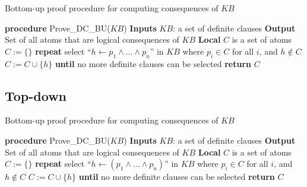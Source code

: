 \documentclass[12pt,a4paper, brazil]{article}
\begin{document}
\begin{algorithm}[!ht]
  \caption{Bottom-up proof procedure for computing consequences of \( KB \)}
  \begin{algorithmic}[1]
  \STATE \textbf{procedure} Prove\_DC\_BU(\( KB \))
  \STATE \textbf{Inputs}
  \STATE \quad \( KB \): a set of definite clauses
  \STATE \textbf{Output}
  \STATE \quad Set of all atoms that are logical consequences of \( KB \)
  \STATE \textbf{Local}
  \STATE \quad \( C \) is a set of atoms
  \STATE \quad \( C := \{\} \)
  \STATE \textbf{repeat}
  \STATE \quad select “\( h \leftarrow p_1 \land \ldots \land p_n \)” in \( KB \) where \( p_i \in C \) for all \( i \), and \( h \notin C \)
  \STATE \quad \( C := C \cup \{h\} \)
  \STATE \textbf{until} no more definite clauses can be selected
  \STATE \textbf{return} \( C \)
  \end{algorithmic}
  \end{algorithm}

\subsection{Top-down}

\begin{algorithm}[!ht]

\caption{Bottom-up proof procedure for computing consequences of \( KB \)}
\label{alg:prove-dc-bu}
\begin{algorithmic}[1]
\STATE \textbf{procedure} Prove\_DC\_BU(\( KB \))
\STATE \textbf{Inputs}
\STATE \quad \( KB \): a set of definite clauses
\STATE \textbf{Output}
\STATE \quad Set of all atoms that are logical consequences of \( KB \)
\STATE \textbf{Local}
\STATE \quad \( C \) is a set of atoms
\STATE \quad \( C := \{\} \)
\STATE \textbf{repeat}
\STATE \quad select “\( h \leftarrow (p_1 \land \ldots \land p_n) \)” in \( KB \) where \( p_i \in C \) for all \( i \), and \( h \notin C \)
\STATE \quad \( C := C \cup \{h\} \)
\STATE \textbf{until} no more definite clauses can be selected
\STATE \textbf{return} \( C \)
\end{algorithmic}
\end{algorithm}




\printbibliography
\end{document}
